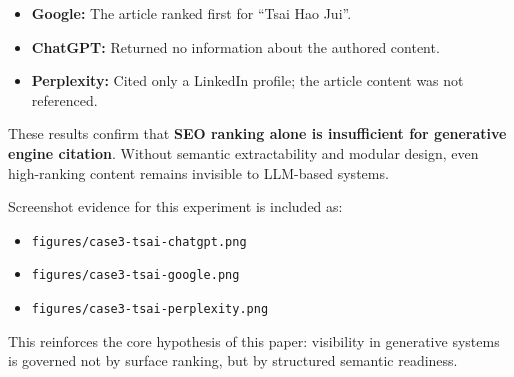 \begin{itemize}
  \item \textbf{Google:} The article ranked first for ``Tsai Hao Jui''.
  \item \textbf{ChatGPT:} Returned no information about the authored content.
  \item \textbf{Perplexity:} Cited only a LinkedIn profile; the article content was not referenced.
\end{itemize}

These results confirm that \textbf{SEO ranking alone is insufficient for generative engine citation}. Without semantic extractability and modular design, even high-ranking content remains invisible to LLM-based systems.

Screenshot evidence for this experiment is included as:

\begin{itemize}
  \item \texttt{figures/case3-tsai-chatgpt.png}
  \item \texttt{figures/case3-tsai-google.png}
  \item \texttt{figures/case3-tsai-perplexity.png}
\end{itemize}

This reinforces the core hypothesis of this paper: visibility in generative systems is governed not by surface ranking, but by structured semantic readiness.
